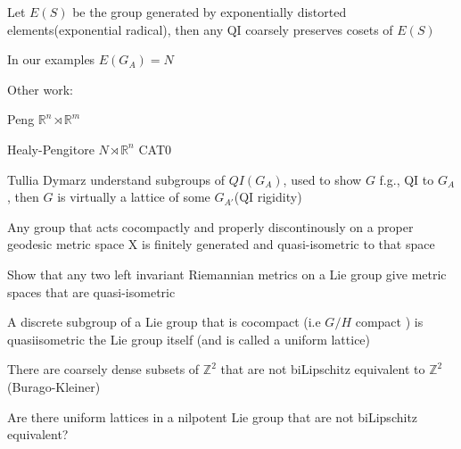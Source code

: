 \documentclass[main]{subfiles}
\begin{document}
\begin{conjecture}
Let $E(S)$ be the group generated by exponentially distorted elements(exponential radical), then any QI coarsely preserves cosets of $E(S)$
\end{conjecture}

\begin{note}
In our examples $E(G_A)=N$
\end{note}

Other work:

Peng $\mathbb R^n\rtimes\mathbb R^m$

Healy-Pengitore $N\rtimes\mathbb R^n$ CAT0

Tullia Dymarz understand subgroups of $QI(G_A)$, used to show $G$ f.g., QI to $G_A$, then $G$ is virtually a lattice of some $G_{A'}$(QI rigidity)



\begin{exercise}[Hard]
 Any group that acts cocompactly and properly discontinously on a proper geodesic metric space X is finitely generated and quasi-isometric to that space
\end{exercise}

\begin{exercise}
Show that any two left invariant Riemannian metrics on a Lie group give metric spaces that are quasi-isometric
\end{exercise}

\begin{exercise}
A discrete subgroup of a Lie group that is cocompact (i.e $G/H$ compact ) is quasiisometric the Lie group itself (and is called a uniform lattice)
\end{exercise}

\begin{exercise}
There are coarsely dense subsets of $\mathbb Z^2$ that are not biLipschitz equivalent to $\mathbb Z^2$ (Burago-Kleiner)
\end{exercise}

\begin{exercise}
Are there uniform lattices in a nilpotent Lie group that are not biLipschitz equivalent?
\end{exercise}
\end{document}
